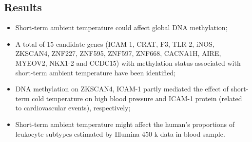 \documentclass[plain, basic]{inVerba-notes}
\begin{document}
\begin{itemize}
\subsection{Results}
\begin{itemize}
  \item Short-term ambient temperature could affect global DNA
  methylation;
  \item A total of 15 candidate genes (ICAM-1, CRAT, F3, TLR-2, iNOS,
  ZKSCAN4, ZNF227, ZNF595, ZNF597, ZNF668, CACNA1H, AIRE, MYEOV2, NKX1-2 and CCDC15) with methylation status associated with short-term ambient temperature have been identified;
  \item DNA methylation on ZKSCAN4, ICAM-1 partly mediated the effect of short-term cold temperature on high blood pressure and ICAM-1 protein (related to cardiovascular events), respectively;
  \item Short-term ambient temperature might affect the human’s
  proportions of leukocyte subtypes estimated by Illumina 450 k
  data in blood sample.
\end{itemize}


\end{itemize}
\end{document}
